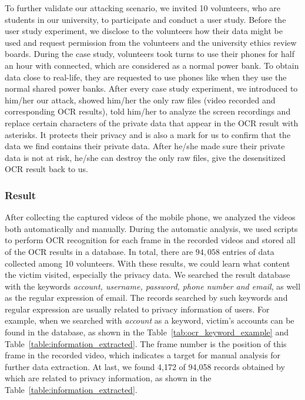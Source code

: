 To further validate our attacking scenario, we invited 10 volunteers, who are students in our university, to participate and conduct a user study.
Before the user study experiment, we disclose to the volunteers how their data might be used and request permission from the volunteers and the university ethics review boards.
During the case study, volunteers took turns to use their phones for half an hour with \tool connected, which are considered as a normal power bank.
To obtain data close to real-life, they are requested to use phones like when they use the normal shared power banks.
After every case study experiment, we introduced to him/her our attack, showed him/her the only raw files (video recorded and corresponding OCR results), told him/her to analyze the screen recordings and replace certain characters of the private data that appear in the OCR result with asterisks. It protects their privacy and is also a mark for us to confirm that the data we find contains their private data. After he/she made sure their private data is not at risk, he/she can destroy the only raw files, give the desensitized OCR result back to us. 


\subsubsection{Result}

After collecting the captured videos of the mobile phone, we analyzed the videos both automatically and manually.
During the automatic analysis, we used scripts to perform OCR recognition for each frame in the recorded videos and stored all of the OCR results in a database.
In total, there are $94,058$ entries of data collected among 10 volunteers.
With these results, we could learn what content the victim visited, especially the privacy data.
We searched the result database with the keywords \textit{account, username, password, phone number and email}, as well as the regular expression of email.
The records searched by such keywords and regular expression are usually related to privacy information of users.
For example, when we searched with \textit{account} as a keyword, victim's accounts can be found in the database, as shown in the Table~\ref{tab:ocr_keyword_example} and Table~\ref{table:information_extracted}.
The frame number is the position of this frame in the recorded video, which indicates a target for manual analysis for further data extraction.
At last, we found 4,172 of 94,058 records obtained by \tool which are related to privacy information, as shown in the Table~\ref{table:information_extracted}.


